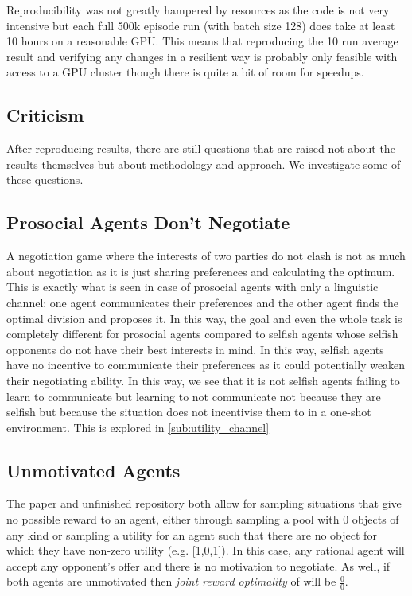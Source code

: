 \documentclass{article}
\begin{document}
Reproducibility was not greatly hampered by resources as the code is not very
intensive but each full 500k episode run (with batch size 128) does take at
least 10 hours on a reasonable GPU. This means that reproducing the 10 run
average result and verifying any changes in a resilient way is probably only
feasible with access to a GPU cluster though there is quite a bit of room for
speedups.

\subsection{Criticism}%
\label{sub:criticism}

After reproducing results, there are still questions that are raised not about
the results themselves but about methodology and approach. We investigate some
of these questions.

\subsection{Prosocial Agents Don't Negotiate}%
\label{sub:prosocial_agents_don_t_negotiate}
A negotiation game where the interests of two parties do not clash is not as
much about negotiation as it is just sharing preferences and calculating the
optimum. This is exactly what is seen in case of prosocial agents with only a
linguistic channel: one agent communicates their preferences and the other
agent finds the optimal division and proposes it. In this way, the goal and even
the whole task is completely different for prosocial agents compared to selfish
agents whose selfish opponents do not have their best interests in mind. In this
way, selfish agents have no incentive to communicate their preferences as it
could potentially weaken their negotiating ability. In this way, we see that it
is not selfish agents failing to learn to communicate but learning to not
communicate not because they are selfish but because the situation does not
incentivise them to in a one-shot environment. This is explored in
\ref{sub:utility_channel}


\subsection{Unmotivated Agents}%
\label{sub:unmotivated_agents}
The paper and unfinished repository both allow for sampling situations that give
no possible reward to an agent, either through sampling a pool with 0 objects of
any kind or sampling a utility for an agent such that there are no object for
which they have non-zero utility (e.g. [1,0,1]). In this case, any rational
agent will accept any opponent's offer and there is no motivation to negotiate.
As well, if both agents are unmotivated then \textit{joint reward optimality}
of \cite{cao2018emergent} will be $\frac{0}{0}$.
\end{document}
